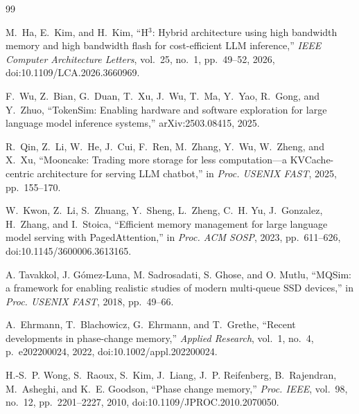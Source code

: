 \documentclass[conference]{IEEEtran}
\begin{document}
\begin{thebibliography}{99}

M.~Ha, E.~Kim, and H.~Kim,
``H$^{3}$: Hybrid architecture using high bandwidth memory and high bandwidth
flash for cost-efficient LLM inference,''
\emph{IEEE Computer Architecture Letters}, vol.~25, no.~1, pp.~49--52, 2026,
doi:10.1109/LCA.2026.3660969.

F.~Wu, Z.~Bian, G.~Duan, T.~Xu, J.~Wu, T.~Ma, Y.~Yao, R.~Gong, and Y.~Zhuo,
``TokenSim: Enabling hardware and software exploration for large language
model inference systems,'' arXiv:2503.08415, 2025.

R.~Qin, Z.~Li, W.~He, J.~Cui, F.~Ren, M.~Zhang, Y.~Wu, W.~Zheng, and X.~Xu,
``Mooncake: Trading more storage for less computation---a KVCache-centric
architecture for serving LLM chatbot,''
in \emph{Proc. USENIX FAST}, 2025, pp.~155--170.

W.~Kwon, Z.~Li, S.~Zhuang, Y.~Sheng, L.~Zheng, C.~H. Yu, J.~Gonzalez, H.~Zhang,
and I.~Stoica,
``Efficient memory management for large language model serving with
PagedAttention,''
in \emph{Proc. ACM SOSP}, 2023, pp.~611--626,
doi:10.1145/3600006.3613165.

A. Tavakkol, J. G\'{o}mez-Luna, M. Sadrosadati, S. Ghose, and O. Mutlu,
``MQSim: a framework for enabling realistic studies of modern multi-queue SSD
devices,''
in \emph{Proc. USENIX FAST}, 2018, pp.~49--66.

A.~Ehrmann, T.~Blachowicz, G.~Ehrmann, and T.~Grethe,
``Recent developments in phase-change memory,''
\emph{Applied Research}, vol.~1, no.~4, p.~e202200024, 2022,
doi:10.1002/appl.202200024.

H.-S.~P. Wong, S.~Raoux, S.~Kim, J.~Liang, J.~P. Reifenberg, B.~Rajendran,
M.~Asheghi, and K.~E. Goodson,
``Phase change memory,''
\emph{Proc. IEEE}, vol.~98, no.~12, pp.~2201--2227, 2010,
doi:10.1109/JPROC.2010.2070050.


\end{thebibliography}
\end{document}
